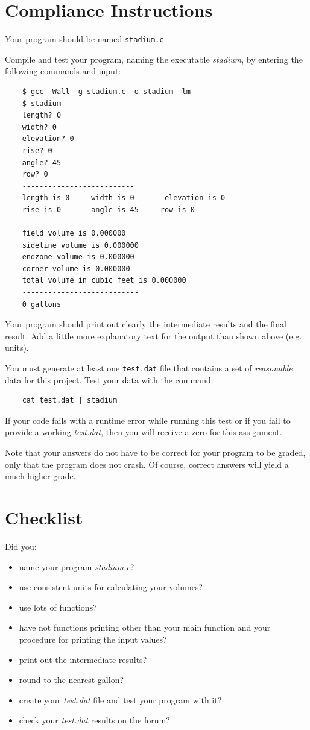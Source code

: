 \documentclass[12pt]{article}
\begin{document}
\section*{Compliance Instructions}

Your program should be named {\tt stadium.c}.

Compile and test your program, naming the executable {\it stadium}, by entering
the following commands and input:

\begin{verbatim}
    $ gcc -Wall -g stadium.c -o stadium -lm
    $ stadium
    length? 0
    width? 0
    elevation? 0
    rise? 0
    angle? 45
    row? 0
    --------------------------
    length is 0     width is 0       elevation is 0
    rise is 0       angle is 45     row is 0
    --------------------------
    field volume is 0.000000
    sideline volume is 0.000000
    endzone volume is 0.000000
    corner volume is 0.000000
    total volume in cubic feet is 0.000000
    ---------------------------
    0 gallons
\end{verbatim}

Your program should print out clearly the intermediate results
and the final result. Add a little more explanatory text for the
output than shown above (e.g. units).

You must generate at least one {\tt test.dat} file that contains a set 
of {\it reasonable} data for this project.   Test your data with the command:

\begin{verbatim}
    cat test.dat | stadium
\end{verbatim}

\color{red}
If your code fails with a runtime error while running this test
or if you fail to provide a working {\it test.dat},
then you will receive a zero for this assignment.
\color{black}

Note that your answers do not have to be correct for your program to be graded,
only that the program does not crash. Of course, correct answers will yield 
a much higher grade.

\section*{Checklist}

Did you:

\begin{itemize}
\item
    name your program {\it stadium.c}?
\item
    use consistent units for calculating your volumes?
\item
    use lots of functions?
\item
    have not functions printing other than  your main function and your procedure for printing the input values?
\item
    print out the intermediate results?
\item
    round to the nearest gallon?
\item
    create your {\it test.dat} file and test your program with it?
\item
    check your {\it test.dat} results on the forum?
\end{itemize}
\end{document}
